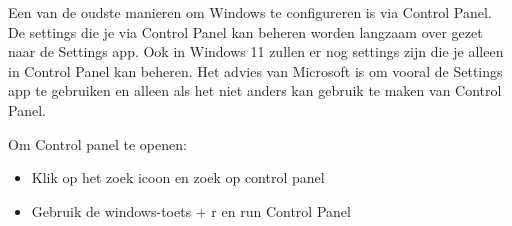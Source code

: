 Een van de oudste manieren om Windows te configureren is via Control Panel. De settings die je via Control Panel kan beheren worden langzaam over gezet naar de Settings app. Ook in Windows 11 zullen er nog settings zijn die je alleen in Control Panel kan beheren. Het advies van Microsoft is om vooral de Settings app te gebruiken en alleen als het niet anders kan gebruik te maken van Control Panel.

Om Control panel te openen:
\begin{itemize}
\item Klik op het zoek icoon en zoek op control panel
\item Gebruik de windows-toets + r en run Control Panel
\end{itemize}

\begin{minipage}[t]{\linewidth}
\raggedright
{}
\end{minipage}

